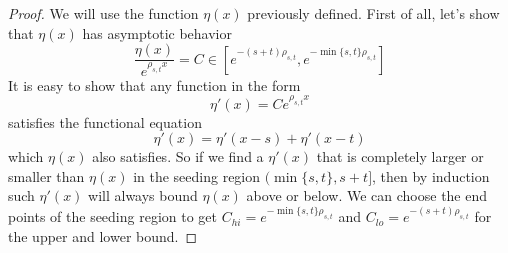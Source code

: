 \documentclass[]{article}
\begin{document}
\begin{proof}
	
	We will use the function $\eta(x)$ previously defined. First of all, let's show that $\eta(x)$ has asymptotic behavior
	\[
	\frac{\eta(x)}{e^{\rho_{s,t} x}} = C \in [e^{-(s+t)\rho_{s,t}},e^{-\min\{s,t\}\rho_{s,t}}]
	\]
	It is easy to show that any function in the form 
	\[
	\eta'(x) = C e^{\rho_{s,t} x}
	\]
	satisfies the functional equation 
	\[
	\eta'(x) = \eta'(x - s) + \eta'(x - t)
	\]
	which $\eta(x)$ also satisfies. So if we find a $\eta'(x)$ that is completely larger or smaller than $\eta(x)$ in the seeding region $(\min\{s,t\}, s+t]$, then by induction such $\eta'(x)$ will always bound $\eta(x)$ above or below. We can choose the end points of the seeding region to get $C_{hi} = e^{-\min\{s,t\}\rho_{s,t}}$ and $C_{lo} = e^{-(s+t)\rho_{s,t}}$ for the upper and lower bound.
	

\end{proof}
\end{document}
